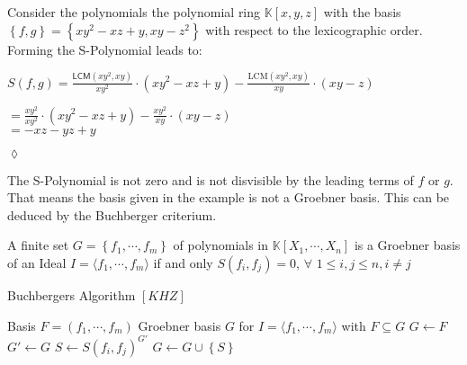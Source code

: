 \newpage

\begin{env_example}\normalfont
Consider the polynomials the polynomial ring $\mathbb{K}\left[ x,y,z\right] $ with
the basis $\left\lbrace f,g\right\rbrace = \left\lbrace xy^{2}-xz+y,xy-z^{2} \right\rbrace $ with respect to the lexicographic order.\\
Forming the S-Polynomial leads to:

\begin{center}
$
 S\left( f,g\right) = \frac{\textsf{LCM}\left( xy^{2}, xy \right) } {xy^{2} } \cdot \left(  xy^{2}-xz+y\right) - \frac{\textrm{LCM}\left( xy^{2}, xy \right) } {xy } \cdot \left( xy-z \right)  
$

 $ = \frac{xy^{2}}{xy^{2}} \cdot \left( xy^{2}-xz+y\right) - \frac{xy^{2}}{xy} \cdot \left( xy-z\right) $\\
 $ = -xz-yz+y $
\end{center}


\begin{flushright}
$\lozenge$
\end{flushright} 
\end{env_example}

The S-Polynomial is not zero and is not disvisible by the leading terms of $f$ or $g$. That means the basis given in the example is not a Groebner basis. This can be deduced by the Buchberger criterium.

\begin{env_definition}
\cite{KHZ} A finite set $G = \left\lbrace f_{1}, \cdots , f_{m} \right\rbrace$ of polynomials in $ \mathbb{K}\left[X_{1}, \cdots, X_{n}\right] $ is a Groebner basis of an Ideal 
$I = \langle f_{1}, \cdots , f_{m} \rangle $ if and only $S\left( f_{i},f_{j}\right) = 0$, $ \forall$  $1 \leq i,j \leq n, i\neq j $

\end{env_definition}

\begin{algorithm}
\caption{Buchbergers Algorithm $[KHZ]$}
\label{alg:buchberger}
\begin{algorithmic}[1]
\Require Basis $F = \left( f_{1}, \cdots, f_{m} \right)  $
\Ensure Groebner basis $G$ for $I = \langle f_{1}, \cdots, f_{m} \rangle $ with $ F \subseteq G $
\State $G \gets F$
\Repeat
\State $G'\gets G $
\State $S \gets S\left( f_{i},f_{j} \right)^{G'}  $ 
\State $G \gets G \cup \left\lbrace S\right\rbrace $
\EndIf
\EndFor
{}

\end{algorithmic}
\end{algorithm}

